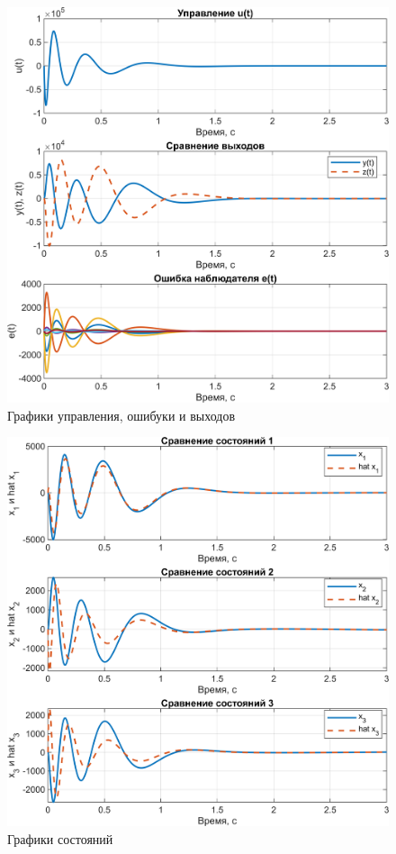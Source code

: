 \begin{figure}[H]
    \centering
    \includegraphics[width=\linewidth]{figs/task3_1.png}
    \caption{Графики управления, ошибуки и выходов}
    \label{fig:3.1}
\end{figure}

\begin{figure}[H]
    \centering
    \includegraphics[width=\linewidth]{figs/task3_2.png}
    \caption{Графики состояний}
    \label{fig:3.2}
\end{figure}

